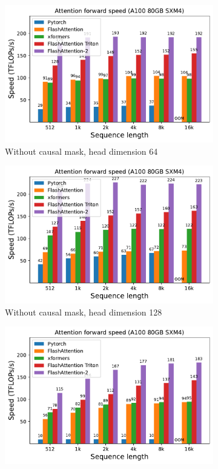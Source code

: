 \begin{figure}[ht]
  \centering
  \begin{subfigure}{.5\textwidth}
    \centering
    \includegraphics[width=.95\linewidth]{figs/flash2_causal_False_hdim_64_fwd_speed.pdf}
    \caption{Without causal mask, head dimension 64}
  \end{subfigure}%
  \begin{subfigure}{.5\textwidth}
    \centering
    \includegraphics[width=.95\linewidth]{figs/flash2_causal_False_hdim_128_fwd_speed.pdf}
    \caption{Without causal mask, head dimension 128}
  \end{subfigure}
  \begin{subfigure}{.5\textwidth}
    \centering
    \includegraphics[width=.95\linewidth]{figs/flash2_causal_True_hdim_64_fwd_speed.pdf}

\end{subfigure}
\end{figure}
